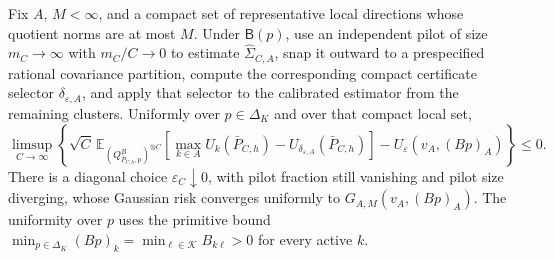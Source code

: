 Fix \(A\), \(M<\infty\), and a compact set of representative local directions whose quotient norms are at most \(M\).  Under \(\mathsf B(p)\), use an independent pilot of size \(m_C\to\infty\) with \(m_C/C\to0\) to estimate \(\widehat\Sigma_{C,A}\), snap it outward to a prespecified rational covariance partition, compute the corresponding compact certificate selector \(\delta_{\varepsilon,A}\), and apply that selector to the calibrated estimator from the remaining clusters.  Uniformly over \(p\in\Delta_K\) and over that compact local set,
\[
\limsup_{C\to\infty}\left\{\sqrt C\,\mathbb E_{(Q^B_{\bar P_{C,h},p})^{\otimes C}}
\left[\max_{k\in A}U_k(\bar P_{C,h})-U_{\delta_{\varepsilon,A}}(\bar P_{C,h})\right]
-U_\varepsilon(v_A,(Bp)_A)\right\}\leq0.
\]
There is a diagonal choice \(\varepsilon_C\downarrow0\), with pilot fraction still vanishing and pilot size diverging, whose Gaussian risk converges uniformly to \(G_{A,M}(v_A,(Bp)_A)\).  The uniformity over \(p\) uses the primitive bound \(\min_{p\in\Delta_K}(Bp)_k=\min_{\ell\in\mathcal K}B_{k\ell}>0\) for every active \(k\).